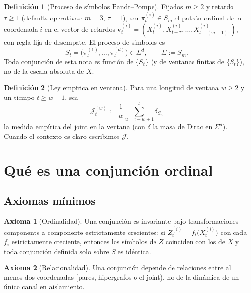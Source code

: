\documentclass[11pt,a4paper]{article}
\theoremstyle{definition}
\newtheorem{definition}{Definici\'on}[section]
\newtheorem{axiom}{Axioma}[section]
\theoremstyle{plain}
\theoremstyle{remark}
\newcommand{\Jwin}{\mathcal{J}}
\begin{document}
\begin{definition}[Proceso de s\'imbolos Bandt--Pompe]
\label{def:symbols}
Fijados $m\ge 2$ y retardo $\tau\ge 1$ (defaults operativos: $m=3$,
$\tau=1$), sea $\pi_t^{(i)}\in S_m$ el patr\'on ordinal de la coordenada
$i$ en el vector de retardos
$\mathbf{v}_t^{(i)}=(X_t^{(i)},X_{t+\tau}^{(i)},\ldots,X_{t+(m-1)\tau}^{(i)})$,
con regla fija de desempate. El proceso de s\'imbolos es
\begin{equation}
\label{eq:S}
S_t=\bigl(\pi_t^{(1)},\ldots,\pi_t^{(d)}\bigr)\in\Sigma^d,
\qquad \Sigma:=S_m.
\end{equation}
Toda conjunci\'on de esta nota es funci\'on de $\{S_t\}$ (y de ventanas
finitas de $\{S_t\}$), no de la escala absoluta de $X$.
\end{definition}

\begin{definition}[Ley emp\'irica en ventana]
\label{def:J}
Para una longitud de ventana $w\ge 2$ y un tiempo $t\ge w-1$, sea
\begin{equation}
\Jwin_t^{(w)}
:=\frac{1}{w}\sum_{u=t-w+1}^{t}\delta_{S_u}
\end{equation}
la medida emp\'irica del joint en la ventana (con $\delta$ la masa de
Dirac en $\Sigma^d$). Cuando el contexto es claro escribimos $\Jwin$.
\end{definition}

\section{Qu\'e es una conjunci\'on ordinal}
\label{sec:conjunction}

\subsection{Axiomas m\'inimos}

\begin{axiom}[Ordinalidad]
\label{ax:A1}
Una conjunci\'on es invariante bajo transformaciones componente a
componente estrictamente crecientes:
si $Z_t^{(i)}=f_i\bigl(X_t^{(i)}\bigr)$ con cada $f_i$ estrictamente
creciente, entonces los s\'imbolos de $Z$ coinciden con los de $X$ y
toda conjunci\'on definida solo sobre $S$ es id\'entica.
\end{axiom}

\begin{axiom}[Relacionalidad]
\label{ax:A2}
Una conjunci\'on depende de relaciones entre al menos dos coordenadas
(pares, hipergrafos o el joint), no de la din\'amica de un \'unico canal
en aislamiento.
\end{axiom}
\end{document}
